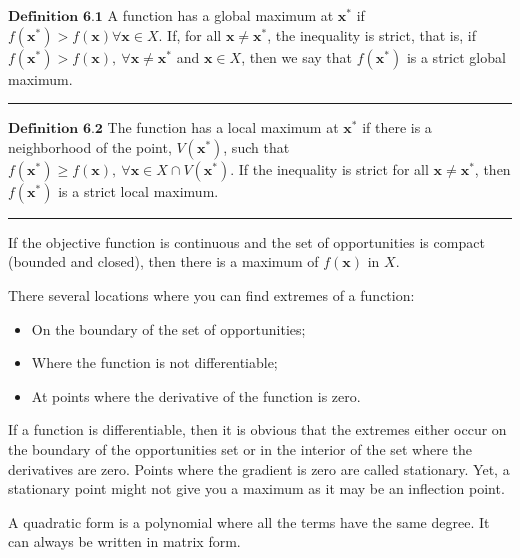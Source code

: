 \documentclass[0pt, a4paper]{article}
\begin{document}
$\textbf{Definition 6.1}$ A function has a global maximum at $\textbf{x}^*$ if $f(\textbf{x}^*)>f(\textbf{x})\forall\textbf{x}\in X$. If, for all $\textbf{x}\neq\textbf{x}^*$, the inequality is strict, that is, if $f(\textbf{x}^*)>f(\textbf{x}),\ \forall\textbf{x}\neq\textbf{x}^*$ and $\textbf{x}\in X$, then we say that $f(\textbf{x}^*)$ is a strict global maximum.

\noindent\rule{\textwidth}{1pt}

$\textbf{Definition 6.2}$ The function has a local maximum at $\textbf{x}^*$ if there is a neighborhood of the point, $V(\textbf{x}^*)$, such that $f(\textbf{x}^*)\geq f(\textbf{x}),\ \forall\textbf{x}\in X \cap V(\textbf{x}^*)$. If the inequality is strict for all $\textbf{x}\neq\textbf{x}^*$, then $f(\textbf{x}^*)$ is a strict local maximum.

\noindent\rule{\textwidth}{1pt}

If the objective function is continuous and the set of opportunities is compact (bounded and closed), then there is a maximum of $f(\textbf{x})$ in $X$.

There several locations where you can find extremes of a function:
\begin{itemize}
	\item On the boundary of the set of opportunities;
	\item Where the function is not differentiable;
	\item At points where the derivative of the function is zero.
\end{itemize}

If a function is differentiable, then it is obvious that the extremes either occur on the boundary of the opportunities set or in the interior of the set where the derivatives are zero. Points where the gradient is zero are called stationary. Yet, a stationary point might not give you a maximum as it may be an inflection point.

A quadratic form is a polynomial where all the terms have the same degree. It can always be written in matrix form.

\clearpage
\end{document}
